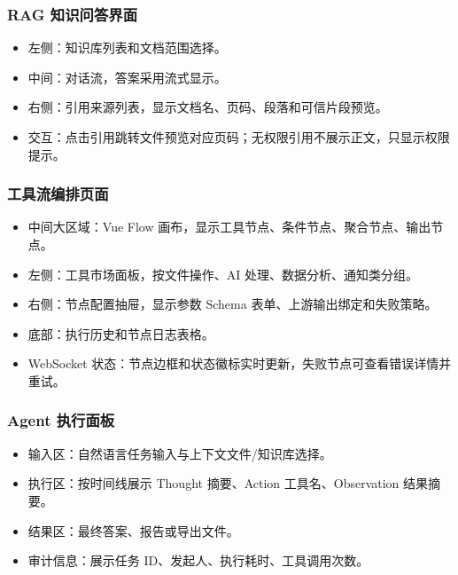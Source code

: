 \documentclass[a4paper,zihao=-4]{ctexart}
\providecommand{\tightlist}{%
  \setlength{\itemsep}{0pt}\setlength{\parskip}{0pt}}
\begin{document}
\hypertarget{rag-ux77e5ux8bc6ux95eeux7b54ux754cux9762}{%
\subsubsection{RAG
知识问答界面}\label{rag-ux77e5ux8bc6ux95eeux7b54ux754cux9762}}

\begin{itemize}
\tightlist
\item
  左侧：知识库列表和文档范围选择。
\item
  中间：对话流，答案采用流式显示。
\item
  右侧：引用来源列表，显示文档名、页码、段落和可信片段预览。
\item
  交互：点击引用跳转文件预览对应页码；无权限引用不展示正文，只显示权限提示。
\end{itemize}

\hypertarget{ux5de5ux5177ux6d41ux7f16ux6392ux9875ux9762}{%
\subsubsection{工具流编排页面}\label{ux5de5ux5177ux6d41ux7f16ux6392ux9875ux9762}}

\begin{itemize}
\tightlist
\item
  中间大区域：Vue Flow
  画布，显示工具节点、条件节点、聚合节点、输出节点。
\item
  左侧：工具市场面板，按文件操作、AI 处理、数据分析、通知类分组。
\item
  右侧：节点配置抽屉，显示参数 Schema 表单、上游输出绑定和失败策略。
\item
  底部：执行历史和节点日志表格。
\item
  WebSocket
  状态：节点边框和状态徽标实时更新，失败节点可查看错误详情并重试。
\end{itemize}

\hypertarget{agent-ux6267ux884cux9762ux677f}{%
\subsubsection{Agent 执行面板}\label{agent-ux6267ux884cux9762ux677f}}

\begin{itemize}
\tightlist
\item
  输入区：自然语言任务输入与上下文文件/知识库选择。
\item
  执行区：按时间线展示 Thought 摘要、Action 工具名、Observation
  结果摘要。
\item
  结果区：最终答案、报告或导出文件。
\item
  审计信息：展示任务 ID、发起人、执行耗时、工具调用次数。
\end{itemize}
\end{document}
